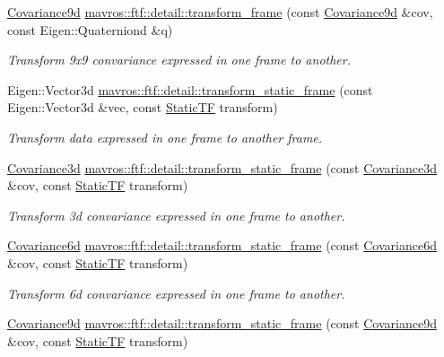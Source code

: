 \begin{DoxyCompactItemize}
\mbox{\hyperlink{group__nodelib_ga6df3c37d3cd74b3e6919e734575bb9b7}{Covariance9d}} \mbox{\hyperlink{group__nodelib_ga885808031ecb3f68701172b0e33f37cd}{mavros\+::ftf\+::detail\+::transform\+\_\+frame}} (const \mbox{\hyperlink{group__nodelib_ga6df3c37d3cd74b3e6919e734575bb9b7}{Covariance9d}} \&cov, const Eigen\+::\+Quaterniond \&q)
\begin{DoxyCompactList}\small\item\em Transform 9x9 convariance expressed in one frame to another. \end{DoxyCompactList}\item 
Eigen\+::\+Vector3d \mbox{\hyperlink{group__nodelib_ga93f1ca2f4ebdb2423f81d88b4fa77c62}{mavros\+::ftf\+::detail\+::transform\+\_\+static\+\_\+frame}} (const Eigen\+::\+Vector3d \&vec, const \mbox{\hyperlink{group__nodelib_gacff0983128574bbbe115917b13e57a63}{Static\+TF}} transform)
\begin{DoxyCompactList}\small\item\em Transform data expressed in one frame to another frame. \end{DoxyCompactList}\item 
\mbox{\hyperlink{group__nodelib_ga56776cc8f5410a6bfeafa085fcd6fe30}{Covariance3d}} \mbox{\hyperlink{group__nodelib_ga3a1e55d923c06a8914f7fe570dd42c9b}{mavros\+::ftf\+::detail\+::transform\+\_\+static\+\_\+frame}} (const \mbox{\hyperlink{group__nodelib_ga56776cc8f5410a6bfeafa085fcd6fe30}{Covariance3d}} \&cov, const \mbox{\hyperlink{group__nodelib_gacff0983128574bbbe115917b13e57a63}{Static\+TF}} transform)
\begin{DoxyCompactList}\small\item\em Transform 3d convariance expressed in one frame to another. \end{DoxyCompactList}\item 
\mbox{\hyperlink{group__nodelib_gadc24a922dd3f6a7ff0d7aed9bda42bca}{Covariance6d}} \mbox{\hyperlink{group__nodelib_gaab4caf957e54695a814cedf5fc45aeb1}{mavros\+::ftf\+::detail\+::transform\+\_\+static\+\_\+frame}} (const \mbox{\hyperlink{group__nodelib_gadc24a922dd3f6a7ff0d7aed9bda42bca}{Covariance6d}} \&cov, const \mbox{\hyperlink{group__nodelib_gacff0983128574bbbe115917b13e57a63}{Static\+TF}} transform)
\begin{DoxyCompactList}\small\item\em Transform 6d convariance expressed in one frame to another. \end{DoxyCompactList}\item 
\mbox{\hyperlink{group__nodelib_ga6df3c37d3cd74b3e6919e734575bb9b7}{Covariance9d}} \mbox{\hyperlink{group__nodelib_gacfea1c0d9ca98b288f6b8f2d17bc4fc0}{mavros\+::ftf\+::detail\+::transform\+\_\+static\+\_\+frame}} (const \mbox{\hyperlink{group__nodelib_ga6df3c37d3cd74b3e6919e734575bb9b7}{Covariance9d}} \&cov, const \mbox{\hyperlink{group__nodelib_gacff0983128574bbbe115917b13e57a63}{Static\+TF}} transform)

\end{DoxyCompactItemize}
